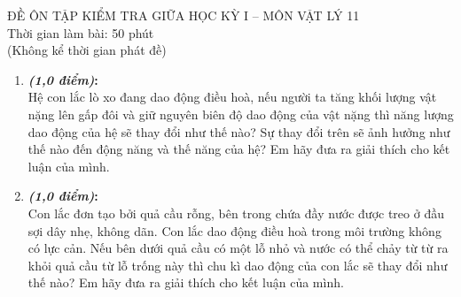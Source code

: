\begin{center}
	ĐỀ ÔN TẬP KIỂM TRA GIỮA HỌC KỲ I – MÔN VẬT LÝ 11\\
	Thời gian làm bài: 50 phút \\
	(Không kể thời gian phát đề)\\
\end{center}
\begin{enumerate}[label=\bfseries Câu \arabic*]
	\item \textbf{\textit{(1,0 điểm)}:}\\
	Hệ con lắc lò xo đang dao động điều hoà, nếu người ta tăng khối lượng vật nặng lên gấp đôi và giữ nguyên biên độ dao động của vật nặng thì năng lượng dao động của hệ sẽ thay đổi như thế nào? Sự thay đổi trên sẽ ảnh hưởng như thế nào đến động năng và thế năng của hệ? Em hãy đưa ra giải thích cho kết luận của mình.

\item \textbf{\textit{(1,0 điểm)}:}\\
Con lắc đơn tạo bởi quả cầu rỗng, bên trong chứa đầy nước được treo ở đầu sợi dây nhẹ, không dãn. Con lắc dao động điều hoà trong môi trường không có lực cản. Nếu bên dưới quả cầu có một lỗ nhỏ và nước có thể chảy từ từ ra khỏi quả cầu từ lỗ trống này thì chu kì dao động của con lắc sẽ thay đổi như thế nào? Em hãy đưa ra giải thích cho kết luận của mình.


\end{enumerate}
